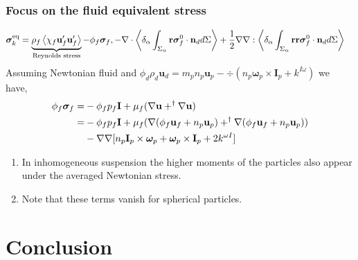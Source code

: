 \documentclass{sintefbeamer}
\begin{document}
\begin{frame}
  \frametitle{Focus on the fluid equivalent stress}
  \begin{align*}
    &\bm{\sigma}_k^\text{eq}
    = 
    \underbrace{\rho_f\avg{\chi_f \textbf{u}_f'\textbf{u}_f'}}_\text{Reynolds stress}
    - \phi_f \bm{\sigma}_f,%
    - \div \pSavg{\textbf{r}\bm{\sigma}_f^0 \cdot \textbf{n}_d}
    +\frac{1}{2} \grad\grad : \pSavg{\textbf{rr}\bm{\sigma}_f^0 \cdot \textbf{n}_d}
  \end{align*}
  Assuming Newtonian fluid and $\phi_d \rho_d \textbf{u}_d = m_p n_p \textbf{u}_p 
  - \div (n_p\bm\omega_p \times \textbf{I}_p+ {k}^{I\omega})$ we have, 
  \begin{align*}
    \phi_f \bm{\sigma}_f
    =& -\phi_f  p_f \textbf{I}
    + \mu_f (
      \mathbf{\nabla} \textbf{u}
      + ^\dagger \mathbf{\nabla} \textbf{u}
    )\\
    =& -\phi_f  p_f \textbf{I}
    + \mu_f (
      \mathbf{\nabla} (\phi_f\textbf{u}_f+n_p\textbf{u}_p)
      + ^\dagger \mathbf{\nabla} (\phi_f\textbf{u}_f+n_p\textbf{u}_p)
      ) \\
      &- \mathbf{\nabla}\mathbf{\nabla} [n_p\textbf{I}_p \times \bm\omega_p+ \bm\omega_p \times \textbf{I}_p + 2{k}^{\omega I}]
  \end{align*}
\begin{enumerate}
  \item In inhomogeneous suspension the higher moments of the particles also appear under the averaged Newtonian stress. 
  \item Note that these terms vanish for spherical particles. 
\end{enumerate}

\end{frame}


\section{Conclusion }
\end{document}
